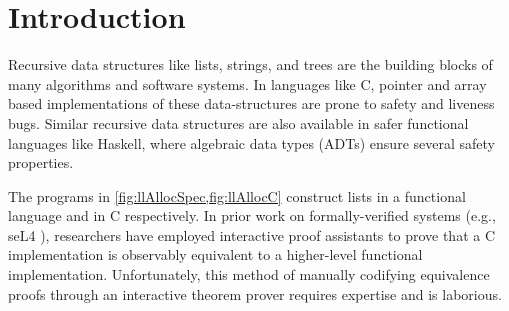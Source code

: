 \section{Introduction}
\label{sec:intro}

Recursive data structures like lists, strings, and trees
are the building blocks of many algorithms and
software systems. In languages
like C, pointer and array based
implementations of these data-structures
are prone to safety and liveness bugs.
Similar recursive data structures
are also available in safer functional languages
like Haskell, where
algebraic data types (ADTs) \cite{hope} ensure
several safety properties.




The programs
in \cref{fig:llAllocSpec,fig:llAllocC}
construct lists in a functional language and in C respectively.
In prior work on formally-verified systems (e.g., seL4 \cite{seL4}),
researchers have employed interactive proof assistants
to prove that a
C implementation is observably
equivalent to
a higher-level
functional implementation.
Unfortunately, this method
of manually codifying equivalence proofs
through an interactive theorem
prover requires expertise and is laborious.

